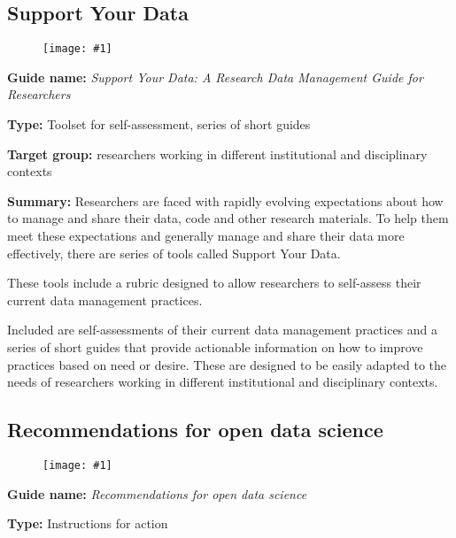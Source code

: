 \documentclass{article}
\newlength{\imgwidth}
\newcommand\scaledgraphics[2]{%
                
\settowidth{\imgwidth}{\texttt{[image: \#1]}}%
                
\setlength{\imgwidth}{\minof{\imgwidth}{#2\textwidth}}%
                
\texttt{[image: \#1]}%
                
}
\begin{document}
\subsection{Support Your Data}\label{H2541051}



\begin{center}
\begin{figure}
\scaledgraphics{45bdf5de-7e5b-448d-820a-d3b3288a4dbe.png}{0.5}
\label{F88206441}
\end{figure}


\end{center}


\textbf{Guide name:} \emph{Support Your Data: A Research Data Management Guide for Researchers} \autocite{borghi_support_2018}


\textbf{Type:} Toolset for self-assessment, series of short guides


\textbf{Target group:} researchers working in different institutional and disciplinary contexts


\textbf{Summary:} Researchers are faced with rapidly evolving expectations about how to manage and share their data, code and other research materials. To help them meet these expectations and generally manage and share their data more effectively, there are series of tools called Support Your Data.


These tools include a rubric designed to allow researchers to self-assess their current data management practices.


Included are self-assessments of their current data management practices and a series of short guides that provide actionable information on how to improve practices based on need or desire. These are designed to be easily adapted to the needs of researchers working in different institutional and disciplinary contexts.


\subsection{Recommendations for open data science}\label{H2986141}


\begin{figure}
\scaledgraphics{10e3bc75-5c14-48e3-a161-d685105f455b.png}{1}
\label{F57414871}
\end{figure}


\textbf{Guide name:} \emph{Recommendations for open data science} \autocite{gymrek_recommendations_2016}


\textbf{Type:} Instructions for action
\end{document}
